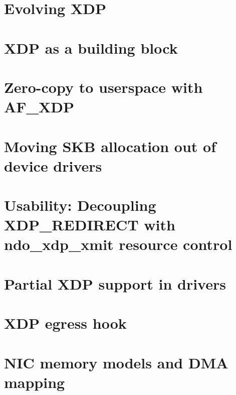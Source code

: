 \documentclass[sigconf]{acmart}
\begin{document}
\section{Evolving XDP}
\label{sec:evolving-xdp}

\section{XDP as a building block}
\label{sec:xdp-as-building}

\section{Zero-copy to userspace with AF\_XDP}
\label{sec:zero-copy-userspace}

\section{Moving SKB allocation out of device drivers}
\label{sec:moving-skb-alloc}

\section{Usability: Decoupling XDP\_REDIRECT with ndo\_xdp\_xmit resource
  control}
\label{sec:usab-deco-xdp_r}

\section{Partial XDP support in drivers}
\label{sec:partial-xdp-support}

\section{XDP egress hook}
\label{sec:xdp-egress-hook}

\section{NIC memory models and DMA mapping}
\label{sec:nic-memory-models}





\end{document}
